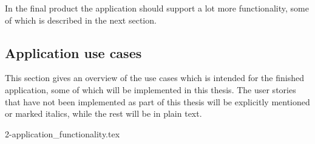 In the final product the application should support a lot more functionality, some of which is described in the next section.


\subsection{Application use cases}
This section gives an overview of the use cases which is intended for the finished application, some of which will be implemented in this thesis. 
The user stories that have not been implemented as part of this thesis will be explicitly mentioned or marked italics, while the rest will be in plain text.

{2-application_functionality.tex}


